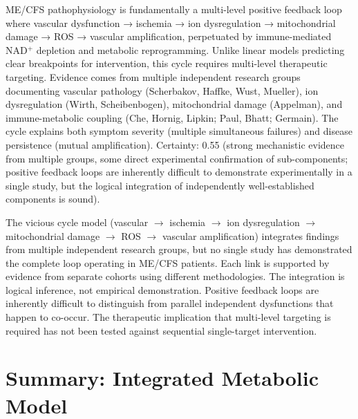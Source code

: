 \begin{hypothesis}
\label{hyp:vicious-cycle-integrated}

ME/CFS pathophysiology is fundamentally a multi-level positive feedback loop where vascular dysfunction → ischemia → ion dysregulation → mitochondrial damage → ROS → vascular amplification, perpetuated by immune-mediated NAD$^+$ depletion and metabolic reprogramming. Unlike linear models predicting clear breakpoints for intervention, this cycle requires multi-level therapeutic targeting. Evidence comes from multiple independent research groups documenting vascular pathology (Scherbakov, Haffke, Wust, Mueller), ion dysregulation (Wirth, Scheibenbogen), mitochondrial damage (Appelman), and immune-metabolic coupling (Che, Hornig, Lipkin; Paul, Bhatt; Germain). The cycle explains both symptom severity (multiple simultaneous failures) and disease persistence (mutual amplification). Certainty: 0.55 (strong mechanistic evidence from multiple groups, some direct experimental confirmation of sub-components; positive feedback loops are inherently difficult to demonstrate experimentally in a single study, but the logical integration of independently well-established components is sound).

\end{hypothesis}

\begin{limitation}
The vicious cycle model (vascular $\to$ ischemia $\to$ ion dysregulation $\to$ mitochondrial damage $\to$ ROS $\to$ vascular amplification) integrates findings from multiple independent research groups, but no single study has demonstrated the complete loop operating in ME/CFS patients. Each link is supported by evidence from separate cohorts using different methodologies. The integration is logical inference, not empirical demonstration. Positive feedback loops are inherently difficult to distinguish from parallel independent dysfunctions that happen to co-occur. The therapeutic implication that multi-level targeting is required has not been tested against sequential single-target intervention.
\end{limitation}

\section{Summary: Integrated Metabolic Model}
\label{sec:metabolism-summary}

